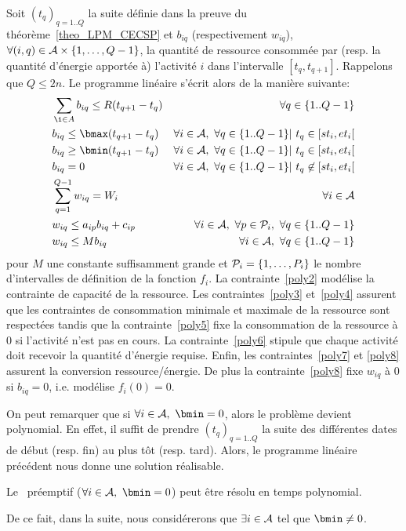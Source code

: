 Soit $(t_q)_{q=1..Q}$ la suite définie dans la preuve du
théorème~\ref{theo_LPM_CECSP} et $b_{iq}$ (respectivement $w_{iq}$),
$\forall (i,q) \in \A\times\{1,\dots,Q-1\}$, la
quantité de ressource consommée par (resp. la quantité d'énergie
apportée à) l'activité $i$ dans l'intervalle
$[t_q,t_{q+1}]$. Rappelons que $Q \le 2n$. Le programme linéaire
s'écrit alors de la manière suivante:
{\small
\begin{align}
&\sum_{\i \in A} b_{iq} \le R(t_{q+1}-t_q)  & \forall q\in
\{1..Q-1\} \label{poly2}\\
& b_{iq} \le \bmax(t_{q+1}-t_q)  & \forall i \in \A,\ \forall q \in \{1..Q-1\} |\
t_q \in [st_i,et_i[\label{poly3}\\
& b_{iq} \ge \bmin (t_{q+1}-t_q) & \forall i \in \A,\ \forall q \in \{1..Q-1\} |\ t_q
\in [st_i,et_i[\label{poly4}\\
 & b_{iq}=0 & \forall i \in \A,\ \forall q \in \{1..Q-1\} |\ t_q
\not\in [st_i,et_i[\label{poly5}\\ 
& \sum_{q=1}^{Q-1} w_{iq} = W_i & \forall i \in
\A\label{poly6}\\
 & w_{iq} \le a_{ip}b_{iq} + c_{ip} & \forall i \in \A,\ \forall p \in
\P_i,\ \forall q \in \{1..Q-1\}\label{poly7}\\ 
& w_{iq} \le Mb_{iq} & \forall i \in \A,\ \forall q \in
\{1..Q-1\}\label{poly8}
\end{align} }
\noindent
pour $M$ une constante suffisamment grande et $\P_i=\{1,\dots,P_i\}$
le nombre d'intervalles de définition de la fonction $f_i$. La
contrainte~\eqref{poly2} modélise la contrainte de capacité de la
ressource. Les contraintes~\eqref{poly3} et~\eqref{poly4} assurent que
les contraintes de consommation minimale et maximale de la ressource
sont respectées tandis que la contrainte~\eqref{poly5} fixe la
consommation de la ressource à $0$ si l'activité n'est pas en
cours. La contrainte~\eqref{poly6} stipule que chaque activité doit
recevoir la quantité d'énergie requise. Enfin, les
contraintes~\eqref{poly7} et \eqref{poly8} assurent la conversion
ressource/énergie. De plus la contrainte~\eqref{poly8} fixe $w_{iq}$ à
$0$ si $b_{iq}=0$, i.e. modélise $f_i(0)=0$.

On peut remarquer que si $\forall i \in \A,\ \bmin=0$, alors le
problème devient polynomial. En effet, il suffit de prendre 
$(t_q)_{q=1..Q}$ la suite des différentes dates de début (resp. fin)
au plus tôt (resp. tard). Alors, le programme linéaire précédent nous
donne une solution réalisable. 

\begin{theo}
Le \CECSP~préemptif ($\forall i \in \A,\ \bmin=0$) peut être résolu en
temps polynomial.
\end{theo}

De ce fait, dans la suite, nous considérerons que $\exists i \in \A$
tel que $\bmin\neq 0$.
